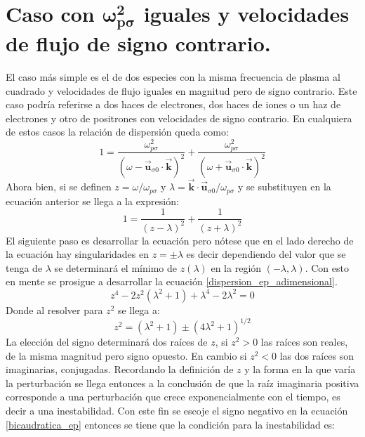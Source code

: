 \documentclass[../tesis_main_file.tex]{subfiles}
\begin{document}
\section{Caso con \texorpdfstring{$\boldsymbol{\omega_{p\sigma}^2}$}{w\textsuperscript{2}} iguales y velocidades de flujo de signo contrario.}
El caso más simple es el de dos especies con la misma frecuencia de plasma al cuadrado y velocidades de flujo iguales en magnitud pero de signo contrario. Este caso podría referirse a dos haces de electrones, dos haces de iones o un haz de electrones y otro de positrones con velocidades de signo contrario. En cualquiera de estos casos la relación de dispersión queda como:
\begin{equation}
\label{dispersion_ep}
1= \frac{\omega_{p\sigma}^2}{(\omega - \overrightarrow{\textbf{u}}_{\sigma 0} \cdot \overrightarrow{\textbf{k}})^2} + \frac{\omega_{p\sigma}^2}{(\omega + \overrightarrow{\textbf{u}}_{\sigma 0} \cdot \overrightarrow{\textbf{k}})^2}
\end{equation}
Ahora bien, si se definen $z= \omega / \omega_{p\sigma}$ y $\lambda = \overrightarrow{\textbf{k}} \cdot \overrightarrow{\textbf{u}}_{\sigma 0}/ \omega_{p\sigma}$ y se substituyen en la ecuación anterior se llega a la expresión:
\begin{equation}
\label{dispersion_ep_adimensional}
1 = \frac{1}{(z - \lambda)^2} + \frac{1}{(z + \lambda)^2}
\end{equation}
El siguiente paso es desarrollar la ecuación pero nótese que en el lado derecho de la ecuación hay singularidades en $z= \pm \lambda$ es decir dependiendo del valor que se tenga de $\lambda$ se determinará el mínimo de $z(\lambda)$ en la región $(- \lambda, \lambda)$. Con esto en mente se prosigue a desarrollar la ecuación \ref{dispersion_ep_adimensional}.
\begin{equation}
z^4 -2z^2(\lambda^2 + 1) +\lambda ^4 -2 \lambda ^2 =0
\end{equation}
Donde al resolver para $z^2$ se llega a:
\begin{equation}
\label{bicaudratica_ep}
z^2= (\lambda^2 +1) \pm (4 \lambda ^2 + 1)^{1/2}
\end{equation}
La elección del signo determinará dos raíces de $z$, si $z^2 >0$ las raíces son reales, de la misma magnitud pero signo opuesto. En cambio si $z^2 <0$ las dos raíces son imaginarias, conjugadas. Recordando la definición de $z$ y la forma en la que varía la perturbación se llega entonces  a la conclusión de que la raíz imaginaria positiva corresponde a una perturbación que crece exponencialmente con el tiempo, es decir a una inestabilidad. Con este fin se escoje el signo negativo en la ecuación \ref{bicaudratica_ep} entonces se tiene que la condición para la inestabilidad es:
\end{document}
